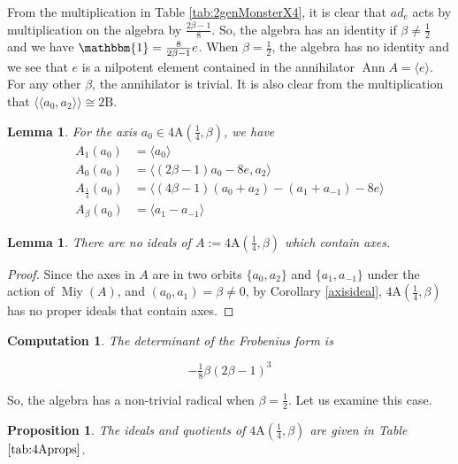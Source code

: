 \documentclass[11pt, a4paper]{article}
\theoremstyle{plain}
\newtheorem{lemma}[theorem]{Lemma}
\newtheorem{proposition}[theorem]{Proposition}
\newtheorem{computation}[theorem]{Computation}
\theoremstyle{definition}
\newcommand\bt{\beta}
\newcommand\la{\langle}
\newcommand\ra{\rangle}
\newcommand\lla{\langle\!\langle}
\newcommand\rra{\rangle\!\rangle}
\DeclareMathOperator{\Ann}{Ann}
\newcommand{\A}{\mathrm{A}}
\newcommand{\B}{\mathrm{B}}
\DeclareMathOperator{\Miy}{Miy}
\newcommand{\0}{\overline{0}}
\newcommand{\2}{\overline{2}}
\newcommand{\1}{\mathbbm{1}}
\begin{document}
From the multiplication in Table \ref{tab:2genMonsterX4}, it is clear that $ad_e$ acts by multiplication on the algebra by $\tfrac{2\bt-1}{8}$. So, the algebra has an identity if $\bt \neq \tfrac{1}{2}$ and we have $ \1 = \tfrac{8}{2\bt -1}e$. When $\bt = \tfrac{1}{2}$, the algebra has no identity and we see that $e$ is a nilpotent element contained in the annihilator $\Ann A = \la e \ra$. For any other $\bt$, the annihilator is trivial.  It is also clear from the multiplication that $\lla a_0, a_2 \rra \cong 2\B$.

\begin{lemma}\label{4Aparts}
	For the axis $a_0 \in 4\A(\frac{1}{4}, \bt)$, we have
	\begin{align*}
		A_1(a_0) &= \la a_0 \ra \\	
		A_0(a_0) &= \la (2\bt-1)a_0 - 8e, a_2 \ra \\
		A_{\frac{1}{4}}(a_0) &= \la (4\bt-1)(a_0 + a_2) - (a_1 + a_{-1}) - 8e \ra \\
		A_\bt(a_0) &= \la a_1 - a_{-1} \ra 
	\end{align*}
\end{lemma}

\begin{lemma}
	There are no ideals of $A := 4\A(\frac{1}{4}, \bt)$ which contain axes.
\end{lemma}
\begin{proof}
	Since the axes in $A$ are in two orbits $\{a_0,a_2\}$ and $\{a_1,a_{-1}\}$ under the action of $\Miy(A)$, and $(a_0, a_1) =  \bt \neq 0$, by Corollary \ref{axisideal}, $4\A(\frac{1}{4}, \bt)$ has no proper ideals that contain axes.
\end{proof}

\begin{computation}
	The determinant of the Frobenius form is
	
	\[
	-\tfrac{1}{8}  \beta  (2\beta - 1)^3
	\]
\end{computation}

So, the algebra has a non-trivial radical when $ \beta = \frac{1}{2} $. Let us examine this case.

\begin{proposition}
	The ideals and quotients of $4\A(\frac{1}{4}, \bt)$ are given in Table $\ref{tab:4Aprops}$.
\end{proposition}
\end{document}
